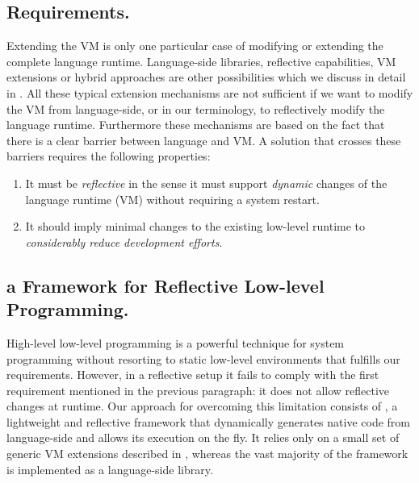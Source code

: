 
\subsection{Requirements.}
Extending the VM is only one particular case of modifying or extending the complete language runtime.
Language-side libraries, reflective capabilities, VM extensions or hybrid approaches are other possibilities which we discuss in detail in .
All these typical extension mechanisms are not sufficient if we want to modify the VM from language-side, or in our terminology, to reflectively modify the language runtime. Furthermore these mechanisms are based on the fact that there is a clear barrier between language and VM.
A solution that crosses these barriers requires the following properties:

\begin{enumerate}
	\item It must be \emph{reflective} in the sense it must support \emph{dynamic} changes of the language runtime (VM) without requiring a system restart.
	\item It should imply minimal changes to the existing low-level runtime to \emph{considerably reduce development efforts}.
\end{enumerate}


\subsection{\B a Framework for Reflective Low-level Programming.}

High-level low-level programming is a powerful technique for system programming without resorting to static low-level environments \cite{Fram09a,Wimm13a} that  fulfills our requirements.
However, in a reflective setup it fails to comply with the first requirement mentioned in the previous paragraph: it does not allow reflective changes at runtime.
Our approach for overcoming this limitation consists of \B, a lightweight and reflective framework that dynamically generates native code from language-side and allows its execution on the fly.
It relies only on a small set of generic VM extensions described in , whereas the vast majority of the framework is implemented as a language-side library.

